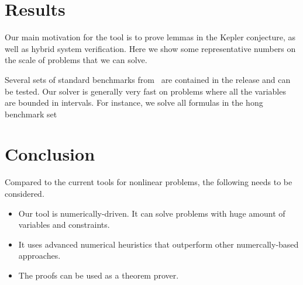\documentclass[envcountsect]{llncs}
\begin{document}
\section{Results}

Our main motivation for the tool is to prove lemmas in the Kepler conjecture,
as well as hybrid system verification. Here we show some representative numbers
on the scale of problems that we can solve. 

Several sets of standard benchmarks from~\cite{} are contained in the release
and can be tested. Our solver is generally very fast on problems where all the
variables are bounded in intervals. For instance, we solve all formulas in the
hong benchmark set~\cite{} 



\section{Conclusion}
Compared to the current tools for nonlinear problems, the following needs to be
considered. 
\begin{itemize}
\item Our tool is numerically-driven. It can solve problems with huge amount of variables and constraints. 
\item It uses advanced numerical heuristics that outperform other
numercally-based approaches. 
\item The proofs can be used as a theorem prover. 
\end{itemize}




\end{document}
